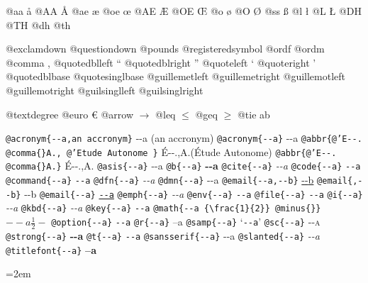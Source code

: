 \documentclass{book}
\newcommand\GNUTexinfocommandstylecodetextcite[1]{{\normalfont{}\textsl{#1}}}%
\begin{document}
@aa \aa{}
@AA \AA{}
@ae \ae{}
@oe \oe{}
@AE \AE{}
@OE \OE{}
@o \o{}
@O \O{}
@ss \ss{}
@l \l{}
@L \L{}
@DH \DH{}
@TH \TH{}
@dh \dh{}
@th \th{}

@exclamdown \textexclamdown{}
@questiondown \textquestiondown{}
@pounds \textsterling{}
@registeredsymbol \circledR{}
@ordf \textordfeminine{}
@ordm \textordmasculine{}
@comma ,
@quotedblleft \textquotedblleft{}
@quotedblright \textquotedblright{}
@quoteleft \textquoteleft{}
@quoteright \textquoteright{}
@quotedblbase \quotedblbase{}
@quotesinglbase \quotesinglbase{}
@guillemetleft \guillemotleft{}
@guillemetright \guillemotright{}
@guillemotleft \guillemotleft{}
@guillemotright \guillemotright{}
@guilsinglleft \guilsinglleft{}
@guilsinglright \guilsinglright{}

@textdegree \textdegree{}
@euro \euro{}
@arrow $\rightarrow{}$
@leq $\leq{}$
@geq $\geq{}$
@tie a\hbox{}b

\texttt{@acronym\{{-}{-}a,an accronym\}} {-}{-}a (an accronym)
\texttt{@acronym\{{-}{-}a\}} {-}{-}a
\texttt{@abbr\{@'E{-}{-}. @comma\{\}A., @'Etude Autonome \}} \'{E}{-}{-}.\@ ,A.\@ (\'{E}tude Autonome)
\texttt{@abbr\{@'E{-}{-}. @comma\{\}A.\}} \'{E}{-}{-}.\@ ,A.\@
\texttt{@asis\{{-}{-}a\}} {-}{-}a
\texttt{@b\{{-}{-}a\}} \textbf{{-}{-}a}
\texttt{@cite\{{-}{-}a\}} \GNUTexinfocommandstylecodetextcite{{-}{-}a}
\texttt{@code\{{-}{-}a\}} \texttt{{-}{-}a}
\texttt{@command\{{-}{-}a\}} \texttt{{-}{-}a}
\texttt{@dfn\{{-}{-}a\}} \textsl{{-}{-}a}
\texttt{@dmn\{{-}{-}a\}} {-}{-}a
\texttt{@email\{{-}{-}a,{-}{-}b\}} \href{mailto:--a}{{-}{-}b}
\texttt{@email\{,{-}{-}b\}} {-}{-}b
\texttt{@email\{{-}{-}a\}} \href{mailto:--a}{\nolinkurl{--a}}
\texttt{@emph\{{-}{-}a\}} \emph{{-}{-}a}
\texttt{@env\{{-}{-}a\}} \texttt{{-}{-}a}
\texttt{@file\{{-}{-}a\}} \texttt{{-}{-}a}
\texttt{@i\{{-}{-}a\}} \textit{{-}{-}a}
\texttt{@kbd\{{-}{-}a\}} {\ttfamily\textsl{{-}{-}a}}
\texttt{@key\{{-}{-}a\}} \texttt{{-}{-}a}
\texttt{@math\{{-}{-}a \{\textbackslash{}frac\{1\}\{2\}\} @minus\{\}\}} $--a {\frac{1}{2}} -$
\texttt{@option\{{-}{-}a\}} \texttt{{-}{-}a}
\texttt{@r\{{-}{-}a\}} \textnormal{--a}
\texttt{@samp\{{-}{-}a\}} `\texttt{{-}{-}a}'
\texttt{@sc\{{-}{-}a\}} \textsc{{-}{-}a}
\texttt{@strong\{{-}{-}a\}} \textbf{{-}{-}a}
\texttt{@t\{{-}{-}a\}} \texttt{{-}{-}a}
\texttt{@sansserif\{{-}{-}a\}} \textsf{{-}{-}a}
\texttt{@slanted\{{-}{-}a\}} \textsl{{-}{-}a}
\texttt{@titlefont\{{-}{-}a\}} \endgroup{}%
{\huge \bfseries --a}\par\begingroup\obeylines\obeyspaces\frenchspacing\leftskip=2em\relax\parskip=0pt\relax\ttfamily{}%
\end{document}

